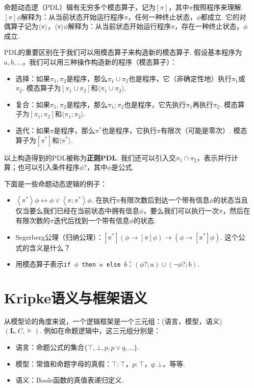 \begin{example}[命题动态逻辑]
命题动态逻（PDL）辑有无穷多个模态算子，记为$[\pi]$，其中$\pi$按照程序来理解. $[\pi]\phi$解释为：从当前状态开始运行程序$\pi$，任何一种终止状态，$\phi$都成立. 它的对偶算子记为$\langle\pi\rangle$，$\langle\pi\rangle\phi$解释为：从当前状态开始运行程序$\pi$，存在一种终止状态，$\phi$成立. 

PDL的重要区别在于我们可以用模态算子来构造新的模态算子. 假设基本程序为$a,b,\dots$，我们可以用三种操作构造新的程序（模态算子）：
\begin{itemize}
    \item 选择：如果$\pi_1,\pi_2$是程序，那么$\pi_1\cup\pi_2$也是程序，它（非确定性地）执行$\pi_1$或$\pi_2$. 模态算子为$[\pi_1\cup\pi_2]$和$\langle\pi_1\cup\pi_2\rangle$.
    \item 复合：如果$\pi_1,\pi_2$是程序，那么$\pi_1;\pi_2$也是程序，它先执行$\pi_1$再执行$\pi_2$. 模态算子为$[\pi_1;\pi_2]$和$\langle\pi_1;\pi_2\rangle$.
    \item 迭代：如果$\pi$是程序，那么$\pi^*$也是程序，它执行$\pi$有限次（可能是零次）. 模态算子为$[\pi^*]$和$\langle\pi^*\rangle$.
\end{itemize}
以上构造得到的PDL被称为\textbf{正则PDL}. 我们还可以引入交$\pi_1\cap\pi_2$，表示并行计算；也可以引入条件程序$\phi?$，其中$\phi$是公式. 

下面是一些命题动态逻辑的例子：
\begin{itemize}
    \item $\left\langle\pi^*\right\rangle \phi \leftrightarrow \phi \vee\left\langle\pi ; \pi^*\right\rangle \phi$. 在执行$\pi$有限次数后到达一个带有信息$\phi$的状态当且仅当要么我们已经在当前状态中拥有信息$\phi$，要么我们可以执行一次$\pi$，然后在有限次数的$\pi$迭代后找到一个带有信息$\phi$的状态. 
    \item Segerberg公理（归纳公理）：$[\pi^*](\phi \to [\pi]\phi) \to (\phi \to [\pi^*]\phi)$. 这个公式的含义是什么？
    \item 用模态算子表示\texttt{if $\phi$ then $a$ else $b$}：$(\phi?;a)\cup(\neg\phi?;b)$. 
\end{itemize}
\end{example}

\section{Kripke语义与框架语义}

从模型论的角度来说，一个逻辑框架是一个三元组：(语言，模型，语义) $(\mathbf L,C,\vDash)$. 例如在命题逻辑中，这三元组分别是：
\begin{itemize}
    \item 语言：命题公式的集合$\{\top,\bot,p,p\vee q,\dots\}$.
    \item 模型：常值和命题字母的真假：$\top:\top$，$p:\top$，$q:\bot$，等等.
    \item 语义：Boole函数的真值表递归定义.
\end{itemize}

